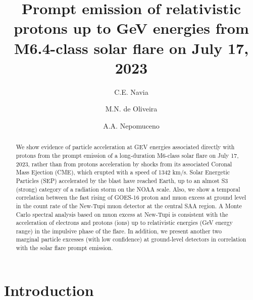 \documentclass[twocolumn]{aastex63}
\begin{document}
\title{Prompt emission of relativistic protons up to GeV energies from M6.4-class solar flare on July 17, 2023}




\author{C.E. Navia}

\author{M.N. de Oliveira}




\author{A.A. Nepomuceno}


\begin{abstract}
We show evidence of particle acceleration at GEV energies associated directly with  protons from the prompt emission of a long-duration M6-class solar flare on July 17, 2023, rather than from protons acceleration by shocks from its associated Coronal Mass Ejection (CME), which erupted with a speed of 1342 km/s. Solar Energetic Particles (SEP) accelerated by the blast have reached Earth, up to an almost S3 (strong) category of a radiation storm on the NOAA scale.  
Also, we show a temporal correlation between the fast rising of GOES-16 proton and muon excess at ground level in the count rate of the New-Tupi muon detector at the central SAA region.
A Monte Carlo spectral analysis based on muon excess at New-Tupi is consistent with the acceleration of electrons and protons (ions) up to relativistic energies (GeV energy range)  in the impulsive phase of the flare. In addition, we present another two marginal particle excesses (with low confidence) at ground-level detectors in correlation with the solar flare prompt emission.
\end{abstract}



\section{Introduction} 
\label{sec1}
\end{document}
